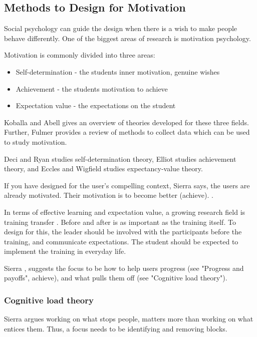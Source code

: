 \subsection{Methods to Design for Motivation}

Social psychology can guide the design when there is a wish to make people behave differently. One of the biggest areas of research is motivation psychology.

Motivation is commonly divided into three areas:
\begin{itemize}
\item Self-determination - the students inner motivation, genuine wishes
\item Achievement - the students motivation to achieve
\item Expectation value - the expectations on the student
\end{itemize}

Koballa \citep{koballa} and Abell \citep{abell} gives an overview of theories developed for these three fields. Further, Fulmer \citep{fulmer} provides a review of methods to collect data which can be used to study motivation.

Deci \citep{deci} and Ryan \citep{ryan} studies self-determination theory, Elliot \citep{elliot} studies achievement theory, and Eccles \citep{eccles} and Wigfield \citep{wigfield} studies expectancy-value theory.

If you have designed for the user's compelling context, Sierra says, the users are already motivated. Their motivation is to become better (achieve). \citep{sierra}.

In terms of effective learning and expectation value, a growing research field is training transfer \citep{brinkerhoff}. Before and after is as important as the training itself. To design for this, the leader should be involved with the participants before the training, and communicate expectations. The student should be expected to implement the training in everyday life. \citep{brinkerhoff}

Sierra \citep{sierra}, suggests the focus to be how to help users progress (see "Progress and payoffs", achieve), and what pulls them off (see "Cognitive load theory").

\subsubsection{Cognitive load theory}

Sierra argues working on what stops people, matters more than working on what entices them. Thus, a focus needs to be identifying and removing blocks.

